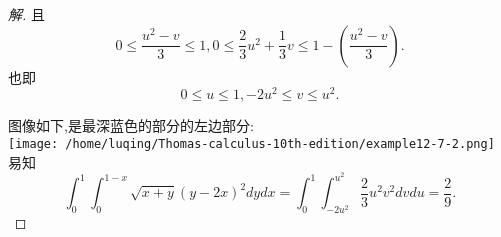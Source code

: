 \documentclass[a4paper, 12pt]{article} %
\begin{document}
\begin{CJK}{UTF8}{gkai}
\begin{proof}[解]
且
$$
0\leq \frac{u^2-v}{3}\leq 1,0\leq \frac{2}{3}u^2+\frac{1}{3}v\leq 1-(\frac{u^2-v}{3}).
$$
也即
$$
0\leq u\leq 1,-2u^2\leq v\leq u^2.
$$

图像如下,是最深蓝色的部分的左边部分:\\
\texttt{[image: /home/luqing/Thomas-calculus-10th-edition/example12-7-2.png]}
易知
$$
\int_0^1\int_0^{1-x}\sqrt{x+y}(y-2x)^2dydx=\int_{0}^1\int_{-2u^2}^{u^2}\frac{2}{3}u^2v^2dvdu=\frac{2}{9}.
$$    
\end{proof}
  

  

  
\end{CJK}
\end{document}
